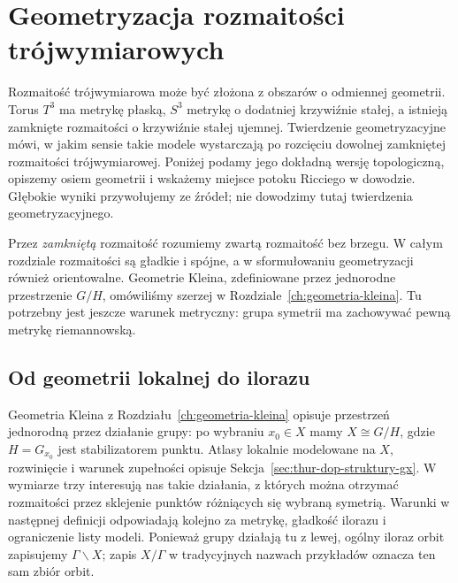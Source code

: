 \chapter{Geometryzacja rozmaitości trójwymiarowych}
\label{ch:geometrizacja-thurstona}

Rozmaitość trójwymiarowa może być złożona z obszarów o odmiennej
geometrii. Torus $T^3$ ma metrykę płaską, $S^3$ metrykę o dodatniej
krzywiźnie stałej, a istnieją zamknięte rozmaitości o krzywiźnie
stałej ujemnej. Twierdzenie geometryzacyjne mówi, w jakim sensie
takie modele wystarczają po rozcięciu dowolnej zamkniętej
rozmaitości trójwymiarowej. Poniżej podamy jego dokładną wersję topologiczną,
opiszemy osiem geometrii i wskażemy miejsce potoku Ricciego w dowodzie.
Głębokie wyniki przywołujemy ze źródeł; nie dowodzimy tutaj
twierdzenia geometryzacyjnego.

Przez \emph{zamkniętą} rozmaitość rozumiemy zwartą rozmaitość bez
brzegu. W całym rozdziale rozmaitości są gładkie i spójne, a w
sformułowaniu geometryzacji również orientowalne. Geometrie Kleina,
zdefiniowane przez jednorodne przestrzenie $G/H$, omówiliśmy szerzej
w Rozdziale~\ref{ch:geometria-kleina}. Tu potrzebny jest jeszcze
warunek metryczny: grupa symetrii ma zachowywać pewną metrykę
riemannowską.

\section{Od geometrii lokalnej do ilorazu}
\label{sec:thurston-model}

Geometria Kleina z Rozdziału~\ref{ch:geometria-kleina} opisuje przestrzeń
jednorodną przez działanie grupy: po wybraniu $x_0\in X$ mamy
$X\cong G/H$, gdzie $H=G_{x_0}$ jest stabilizatorem punktu.
Atlasy lokalnie modelowane na $X$, rozwinięcie i warunek zupełności
opisuje Sekcja~\ref{sec:thur-dop-struktury-gx}.
W wymiarze trzy interesują nas takie działania, z których można
otrzymać rozmaitości przez sklejenie punktów różniących się wybraną
symetrią. Warunki w następnej definicji odpowiadają kolejno za
metrykę, gładkość ilorazu i ograniczenie listy modeli.
Ponieważ grupy działają tu z lewej, ogólny iloraz orbit zapisujemy
$\Gamma\backslash X$; zapis $X/\Gamma$ w tradycyjnych nazwach
przykładów oznacza ten sam zbiór orbit.

